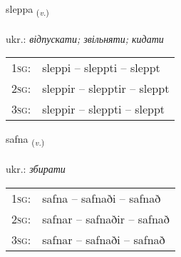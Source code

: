 \documentclass[frontgrid, backgrid]{flacards}\usepackage[]{graphicx}\usepackage[]{xcolor}
\begin{document}
\renewcommand{\flhead}{\vskip5pt \fboxsep=0pt {\small\bfseries\footnotesize Sagnorð | дієслово}}
\renewcommand{\fcfoot}{\vskip5pt \fboxsep=0pt \hspace{2pt}{\small\bfseries\footnotesize 1K}}

\renewcommand{\blhead}{\vskip5pt {\small\bfseries\footnotesize Sagnorð | дієслово }}
\renewcommand{\bcfoot}{\vskip5pt \hspace{2pt}{\small\bfseries\footnotesize 1K}}


{sleppa \small{\textsubscript{(\textit{v.})}} \\[1ex] %
\textphonetic{[stlɛhpa]} \\
ukr.: \emph{відпускати; звільняти; кидати} \\  [2ex]
\renewcommand*{\arraystretch}{0.8}
\begin{tabular}{p{1cm}l}
\textsc{1sg}: & sleppi -- sleppti -- sleppt \\ 
\textsc{2sg}: & sleppir -- slepptir -- sleppt \\ 
\textsc{3sg}: & sleppir -- sleppti -- sleppt \\ 
\end{tabular}
}

\renewcommand{\flhead}{\vskip5pt \fboxsep=0pt {\small\bfseries\footnotesize Sagnorð | дієслово}}
\renewcommand{\fcfoot}{\vskip5pt \fboxsep=0pt \hspace{2pt}{\small\bfseries\footnotesize 1K}}

\renewcommand{\blhead}{\vskip5pt {\small\bfseries\footnotesize Sagnorð | дієслово }}
\renewcommand{\bcfoot}{\vskip5pt \hspace{2pt}{\small\bfseries\footnotesize 1K}}


{safna \small{\textsubscript{(\textit{v.})}} \\[1ex] %
\textphonetic{[sapna]} \\
ukr.: \emph{збирати} \\  [2ex]
\renewcommand*{\arraystretch}{0.8}
\begin{tabular}{p{1cm}l}
\textsc{1sg}: & safna -- safnaði -- safnað \\ 
\textsc{2sg}: & safnar -- safnaðir -- safnað \\ 
\textsc{3sg}: & safnar -- safnaði -- safnað \\ 
\end{tabular}
}
\end{document}
